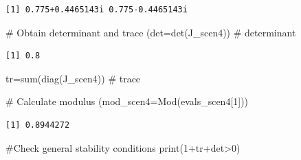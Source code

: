 \documentclass[
  letterpaper,
  DIV=11,
  numbers=noendperiod]{scrreprt}
\newenvironment{Shaded}{\begin{snugshade}}{\end{snugshade}}
\newcommand{\AttributeTok}[1]{\textcolor[rgb]{0.40,0.45,0.13}{#1}}
\newcommand{\CommentTok}[1]{\textcolor[rgb]{0.37,0.37,0.37}{#1}}
\newcommand{\ConstantTok}[1]{\textcolor[rgb]{0.56,0.35,0.01}{#1}}
\newcommand{\DecValTok}[1]{\textcolor[rgb]{0.68,0.00,0.00}{#1}}
\newcommand{\DocumentationTok}[1]{\textcolor[rgb]{0.37,0.37,0.37}{\textit{#1}}}
\newcommand{\FunctionTok}[1]{\textcolor[rgb]{0.28,0.35,0.67}{#1}}
\newcommand{\NormalTok}[1]{\textcolor[rgb]{0.00,0.23,0.31}{#1}}
\newcommand{\OtherTok}[1]{\textcolor[rgb]{0.00,0.23,0.31}{#1}}
\newcommand{\SpecialCharTok}[1]{\textcolor[rgb]{0.37,0.37,0.37}{#1}}
\begin{document}
\begin{Shaded}
\end{Shaded}

\begin{verbatim}
[1] 0.775+0.4465143i 0.775-0.4465143i
\end{verbatim}

\begin{Shaded}
\begin{Highlighting}[]
\CommentTok{\# Obtain determinant and trace}
\NormalTok{(}\AttributeTok{det=}\FunctionTok{det}\NormalTok{(J\_scen4))      }\CommentTok{\# determinant}
\end{Highlighting}
\end{Shaded}

\begin{verbatim}
[1] 0.8
\end{verbatim}

\begin{Shaded}
\begin{Highlighting}[]
\NormalTok{tr}\OtherTok{=}\FunctionTok{sum}\NormalTok{(}\FunctionTok{diag}\NormalTok{(J\_scen4)) }\CommentTok{\# trace}

\CommentTok{\# Calculate modulus}
\NormalTok{(}\AttributeTok{mod\_scen4=}\FunctionTok{Mod}\NormalTok{(evals\_scen4[}\DecValTok{1}\NormalTok{]))}
\end{Highlighting}
\end{Shaded}

\begin{verbatim}
[1] 0.8944272
\end{verbatim}

\begin{Shaded}
\begin{Highlighting}[]
\CommentTok{\#Check general stability conditions}
\FunctionTok{print}\NormalTok{(}\DecValTok{1}\SpecialCharTok{+}\NormalTok{tr}\SpecialCharTok{+}\NormalTok{det}\SpecialCharTok{\textgreater{}}\DecValTok{0}\NormalTok{)}
\end{Highlighting}
\end{Shaded}
\end{document}
